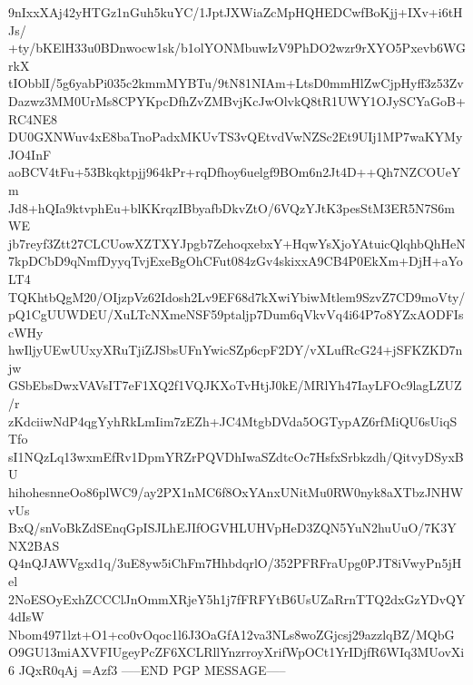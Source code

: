 9nIxxXAj42yHTGz1nGuh5kuYC/1JptJXWiaZcMpHQHEDCwfBoKjj+IXv+i6tHJs/
+ty/bKElH33u0BDnwocw1sk/b1olYONMbuwIzV9PhDO2wzr9rXYO5Pxevb6WGrkX
tIObblI/5g6yabPi035c2kmmMYBTu/9tN81NIAm+LtsD0mmHlZwCjpHyff3z53Zv
Dazwz3MM0UrMs8CPYKpcDfhZvZMBvjKcJwOlvkQ8tR1UWY1OJySCYaGoB+RC4NE8
DU0GXNWuv4xE8baTnoPadxMKUvTS3vQEtvdVwNZSc2Et9UIj1MP7waKYMyJO4InF
aoBCV4tFu+53Bkqktpjj964kPr+rqDfhoy6uelgf9BOm6n2Jt4D++Qh7NZCOUeYm
Jd8+hQIa9ktvphEu+blKKrqzIBbyafbDkvZtO/6VQzYJtK3pesStM3ER5N7S6mWE
jb7reyf3Ztt27CLCUowXZTXYJpgb7ZehoqxebxY+HqwYsXjoYAtuicQlqhbQhHeN
7kpDCbD9qNmfDyyqTvjExeBgOhCFut084zGv4skixxA9CB4P0EkXm+DjH+aYoLT4
TQKhtbQgM20/OIjzpVz62Idosh2Lv9EF68d7kXwiYbiwMtlem9SzvZ7CD9moVty/
pQ1CgUUWDEU/XuLTcNXmeNSF59ptaljp7Dum6qVkvVq4i64P7o8YZxAODFIscWHy
hwIljyUEwUUxyXRuTjiZJSbsUFnYwicSZp6cpF2DY/vXLufRcG24+jSFKZKD7njw
GSbEbsDwxVAVsIT7eF1XQ2f1VQJKXoTvHtjJ0kE/MRlYh47IayLFOc9lagLZUZ/r
zKdciiwNdP4qgYyhRkLmIim7zEZh+JC4MtgbDVda5OGTypAZ6rfMiQU6sUiqSTfo
sI1NQzLq13wxmEfRv1DpmYRZrPQVDhIwaSZdtcOc7HsfxSrbkzdh/QitvyDSyxBU
hihohesnneOo86plWC9/ay2PX1nMC6f8OxYAnxUNitMu0RW0nyk8aXTbzJNHWvUs
BxQ/snVoBkZdSEnqGpISJLhEJIfOGVHLUHVpHeD3ZQN5YuN2huUuO/7K3YNX2BAS
Q4nQJAWVgxd1q/3uE8yw5iChFm7HhbdqrlO/352PFRFraUpg0PJT8iVwyPn5jHel
2NoESOyExhZCCClJnOmmXRjeY5h1j7fFRFYtB6UsUZaRrnTTQ2dxGzYDvQY4dIsW
Nbom4971lzt+O1+co0vOqoc1l6J3OaGfA12va3NLs8woZGjcsj29azzlqBZ/MQbG
O9GU13miAXVFIUgeyPcZF6XCLRllYnzrroyXrifWpOCt1YrIDjfR6WIq3MUovXi6
JQxR0qAj
=Azf3
-----END PGP MESSAGE-----
